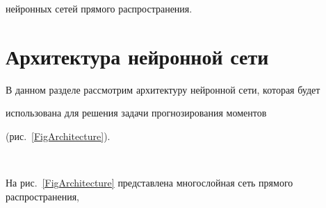 нейронных сетей прямого распространения.





\section{Архитектура нейронной сети}


\label{Architecture}





В данном разделе рассмотрим архитектуру нейронной сети, которая будет 


использована для решения задачи прогнозирования моментов 


(рис.~\ref{FigArchitecture}). 





\pagebreak





\





\vspace*{-12pt}










На рис.~\ref{FigArchitecture} представлена многослойная сеть прямого распространения, 


